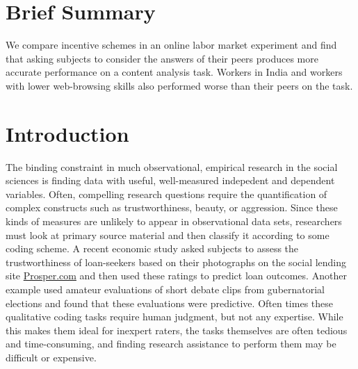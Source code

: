 \documentclass{cscw2010}
\begin{document}

\section{Brief Summary}
We compare incentive schemes in an online labor market experiment and
find that asking subjects to consider the answers of their peers
produces more accurate performance on a content analysis task. Workers
in India and workers with lower web-browsing skills also performed
worse than their peers on the task.

\section{Introduction}
The binding constraint in much observational, empirical research in the social sciences is finding data with useful, well-measured indepedent
and dependent variables. Often, compelling research questions require the quantification of complex constructs such as trustworthiness, beauty, or aggression. Since these kinds of measures are unlikely to appear in observational data sets, researchers must look at primary source material and then classify it according to some coding scheme. A recent economic
  study asked subjects to assess the trustworthiness of
  loan-seekers based on their photographs on the social lending site
  \href{http://www.prosper.com}{Prosper.com} and then used these
  ratings to predict loan outcomes\cite{duarte2009tc}. Another
  example used amateur evaluations of short debate clips
  from gubernatorial elections and found that these evaluations were
  predictive\cite{benjamin2009}. Often times these qualitative coding tasks require human judgment, but not any expertise. While this makes them ideal for inexpert raters, the tasks themselves are often tedious and time-consuming, and finding research assistance to perform them may be difficult or expensive. 
\end{document}
